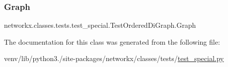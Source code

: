 \subsubsection{\texorpdfstring{Graph}{Graph}}
{\footnotesize\ttfamily networkx.\+classes.\+tests.\+test\+\_\+special.\+Test\+Ordered\+Di\+Graph.\+Graph}



The documentation for this class was generated from the following file\+:\begin{DoxyCompactItemize}
\item 
venv/lib/python3./site-\/packages/networkx/classes/tests/\hyperlink{test__special_8py}{test\+\_\+special.\+py}\end{DoxyCompactItemize}

